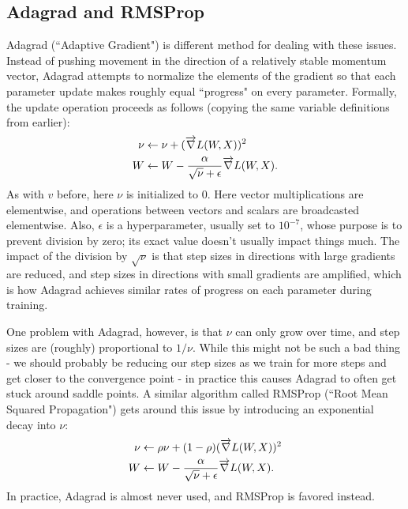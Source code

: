 \subsection{Adagrad and RMSProp}
Adagrad (``Adaptive Gradient") is different method for dealing with these issues. Instead of pushing movement in the direction of a relatively stable momentum vector, Adagrad attempts to normalize the elements of the gradient so that each parameter update makes roughly equal ``progress" on every parameter. Formally, the update operation proceeds as follows (copying the same variable definitions from earlier):
\begin{align*}
\nu &\leftarrow \nu + (\overrightarrow{\nabla} L(W, X))^2\\
W &\leftarrow W - \frac{\alpha}{\sqrt{\nu} + \epsilon} \overrightarrow{\nabla} L(W, X).
\end{align*}
As with $v$ before, here $\nu$ is initialized to 0. Here vector multiplications are elementwise, and operations between vectors and scalars are broadcasted elementwise. Also, $\epsilon$ is a hyperparameter, usually set to $10^{-7}$, whose purpose is to prevent division by zero; its exact value doesn't usually impact things much. The impact of the division by $\sqrt{\nu}$ is that step sizes in directions with large gradients are reduced, and step sizes in directions with small gradients are amplified, which is how Adagrad achieves similar rates of progress on each parameter during training.

One problem with Adagrad, however, is that $\nu$ can only grow over time, and step sizes are (roughly) proportional to $1/\nu$. While this might not be such a bad thing - we should probably be reducing our step sizes as we train for more steps and get closer to the convergence point - in practice this causes Adagrad to often get stuck around saddle points. A similar algorithm called RMSProp (``Root Mean Squared Propagation") gets around this issue by introducing an exponential decay into $\nu$:
\begin{align*}
\nu &\leftarrow \rho\nu + (1 - \rho)(\overrightarrow{\nabla} L(W, X))^2\\
W &\leftarrow W - \frac{\alpha}{\sqrt{\nu} + \epsilon} \overrightarrow{\nabla} L(W, X).
\end{align*}
In practice, Adagrad is almost never used, and RMSProp is favored instead.

